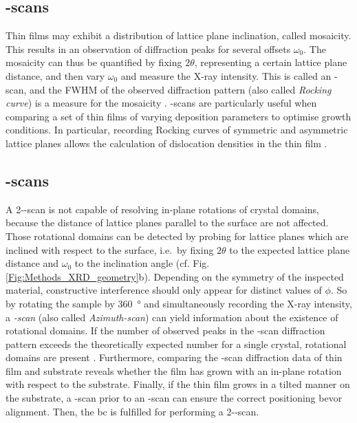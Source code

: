 \subsection{\textomega-scans}
    \label{Sec:Methods_omegaScan}
Thin films may exhibit a distribution of lattice plane inclination, called mosaicity.
This results in an observation of diffraction peaks for several offsets $\omega_0$.
The mosaicity can thus be quantified by fixing $2\theta$, representing a certain lattice plane distance, and then vary $\omega_0$ and measure the X-ray intensity.
This is called an \textomega-scan, and the \gls{FWHM} of the observed diffraction pattern (also called \emph{Rocking curve}) is a measure for the mosaicity
    \cite{harrington2021}.
\textomega-scans are particularly useful when comparing a set of thin films of varying deposition parameters to optimise growth conditions.
In particular, recording Rocking curves of symmetric and asymmetric lattice planes allows the calculation of dislocation densities in the thin film
    \cite{srikant1997}.
\subsection{\textphi-scans}
    \label{Sec:Methods_phiScan}
A 2\texttheta-\textomega-scan is not capable of resolving in-plane rotations of crystal domains, because the distance of lattice planes parallel to the surface are not affected.
Those rotational domains can be detected by probing for lattice planes which are inclined with respect to the surface, i.e.\ by fixing $2\theta$ to the expected lattice plane distance and $\omega_0$ to the inclination angle (cf. Fig.\,\ref{Fig:Methods_XRD_geometry}b).
Depending on the symmetry of the inspected material, constructive interference should only appear for distinct values of $\phi$.
So by rotating the sample by \qty{360}{\degree} and simultaneously recording the X-ray intensity, a \emph{\textphi-scan} (also called \emph{Azimuth-scan}) can yield information about the existence of rotational domains.
If the number of observed peaks in the \textphi-scan diffraction pattern exceeds the theoretically expected number for a single crystal, rotational domains are present
    \cite{harrington2021}.
Furthermore, comparing the \textphi-scan diffraction data of thin film and substrate reveals whether the film has grown with an in-plane rotation with respect to the substrate.
Finally, if the thin film grows in a tilted manner on the substrate, a \textphi-scan prior to an \textomega-scan can ensure the correct positioning bevor alignment.
Then, the \gls{bc} is fulfilled for performing a 2\texttheta-\textomega-scan.

